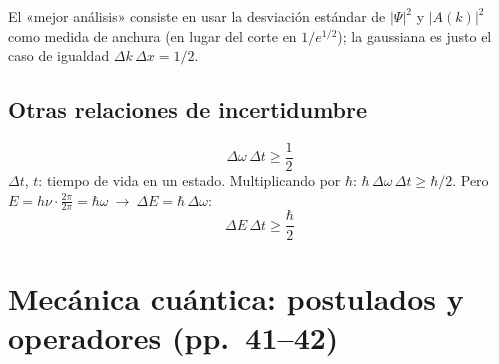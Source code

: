\documentclass[11pt,a4paper]{article}
\newcommand{\pags}[1]{{\normalfont\small\color{gris}(pp.~#1)}}
\begin{document}
\begin{obs}
El «mejor análisis» consiste en usar la desviación estándar de $|\Psi|^2$ y $|A(k)|^2$ como medida de anchura (en lugar
del corte en $1/e^{1/2}$); la gaussiana es justo el caso de igualdad $\Delta k\,\Delta x=1/2$.
\end{obs}

\subsection{Otras relaciones de incertidumbre}
\[
\Delta\omega\,\Delta t\ge\frac12
\]
$\Delta t$, $t$: tiempo de vida en un estado. Multiplicando por $\hbar$: $\hbar\,\Delta\omega\,\Delta t\ge\hbar/2$.
Pero $E=h\nu\cdot\frac{2\pi}{2\pi}=\hbar\omega\ \rightarrow\ \Delta E=\hbar\,\Delta\omega$:
\[
\boxed{\Delta E\,\Delta t\ge\frac{\hbar}{2}}
\]
\section{Mecánica cuántica: postulados y operadores \pags{41--42}}
\end{document}
